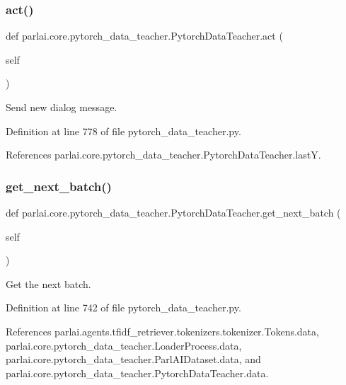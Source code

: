 \subsubsection{\texorpdfstring{act()}{act()}}
{\footnotesize\ttfamily def parlai.\+core.\+pytorch\+\_\+data\+\_\+teacher.\+Pytorch\+Data\+Teacher.\+act (\begin{DoxyParamCaption}\item[{}]{self }\end{DoxyParamCaption})}

\begin{DoxyVerb}Send new dialog message.\end{DoxyVerb}
 

Definition at line 778 of file pytorch\+\_\+data\+\_\+teacher.\+py.



References parlai.\+core.\+pytorch\+\_\+data\+\_\+teacher.\+Pytorch\+Data\+Teacher.\+lastY.

\mbox{\label{classparlai_1_1core_1_1pytorch__data__teacher_1_1PytorchDataTeacher_a6bf71f580e9be5b517897260f76178c4}} 
\subsubsection{\texorpdfstring{get\+\_\+next\+\_\+batch()}{get\_next\_batch()}}
{\footnotesize\ttfamily def parlai.\+core.\+pytorch\+\_\+data\+\_\+teacher.\+Pytorch\+Data\+Teacher.\+get\+\_\+next\+\_\+batch (\begin{DoxyParamCaption}\item[{}]{self }\end{DoxyParamCaption})}

\begin{DoxyVerb}Get the next batch.\end{DoxyVerb}
 

Definition at line 742 of file pytorch\+\_\+data\+\_\+teacher.\+py.



References parlai.\+agents.\+tfidf\+\_\+retriever.\+tokenizers.\+tokenizer.\+Tokens.\+data, parlai.\+core.\+pytorch\+\_\+data\+\_\+teacher.\+Loader\+Process.\+data, parlai.\+core.\+pytorch\+\_\+data\+\_\+teacher.\+Parl\+A\+I\+Dataset.\+data, and parlai.\+core.\+pytorch\+\_\+data\+\_\+teacher.\+Pytorch\+Data\+Teacher.\+data.



